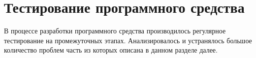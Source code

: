 \section{Тестирование программного средства}
\label{sec:principal}

В процессе разработки программного средства производилось регулярное тестирование
на промежуточных этапах. Анализировалось и устранялось большое количество проблем
часть из которых описана в данном разделе далее.



